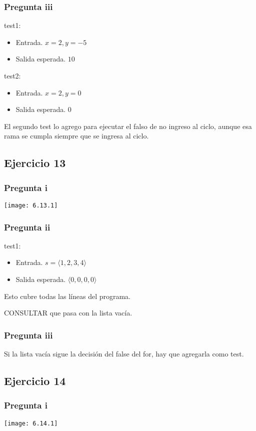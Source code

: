 \subsubsection{Pregunta iii}
test1: 
\begin{itemize}
    \item Entrada. $ x = 2, y = -5 $
    \item Salida esperada. $ 10 $
\end{itemize}

test2: 
\begin{itemize}
    \item Entrada. $ x = 2, y = 0 $
    \item Salida esperada. $ 0 $
\end{itemize}

El segundo test lo agrego para ejecutar el falso de no ingreso al ciclo, aunque esa rama se cumpla siempre que se ingresa al ciclo.

\subsection{Ejercicio 13}
\subsubsection{Pregunta i}
\texttt{[image: 6.13.1]}

\subsubsection{Pregunta ii}
test1:
\begin{itemize}
    \item Entrada. $ s = \langle 1,2,3,4 \rangle $
    \item Salida esperada. $ \langle 0,0,0,0 \rangle $
\end{itemize}
Esto cubre todas las líneas del programa.

CONSULTAR que pasa con la lista vacía.

\subsubsection{Pregunta iii}
Si la lista vacía sigue la decisión del false del for, hay que agregarla como test.

\subsection{Ejercicio 14}
\subsubsection{Pregunta i}
\texttt{[image: 6.14.1]}

